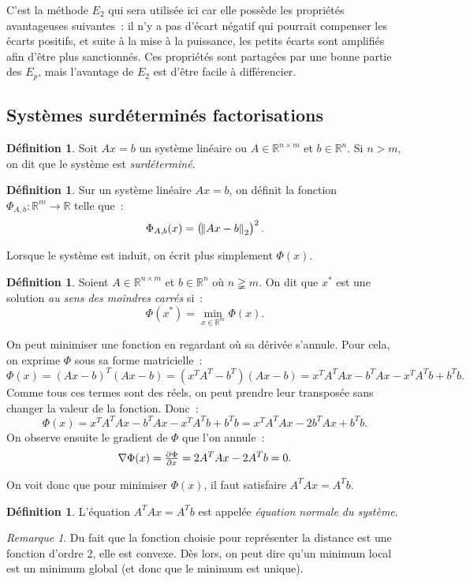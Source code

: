 \documentclass{article}
\theoremstyle{definition}
\newtheorem{déf}[thm]{Définition}
\theoremstyle{remark}
\newtheorem*{rmq}{Remarque}
\newcommand{\R}{\mathbb R}
\begin{document}
		C'est la méthode $E_2$ qui sera utilisée ici car elle possède les propriétés avantageuses suivantes~: il n'y a pas d'écart négatif qui pourrait compenser
		les écarts positifs, et suite à la mise à la puissance, les petits écarts sont amplifiés afin d'être plus sanctionnés. Ces propriétés sont partagées
		par une bonne partie des $E_p$, mais l'avantage de $E_2$ est d'être facile à différencier.

	\subsection{Systèmes surdéterminés factorisations}
		\begin{déf} Soit $Ax = b$ un système linéaire ou $A \in \R^{n \times m}$ et $b \in \R^n$. Si $n > m$, on dit que le système est \emph{surdéterminé}.
		\end{déf}

		\begin{déf} Sur un système linéaire $Ax = b$, on définit la fonction $\Phi_{A,b} : \R^m \to \R$ telle que~:
		\[\Phi_{A,b}(x) = \left(\norm {Ax-b}_2\right)^2.\]

		Lorsque le système est induit, on écrit plus simplement $\Phi(x)$.
		\end{déf}

		\begin{déf} Soient $A \in \R^{n \times m}$ et $b \in \R^n$ où $n \gneqq m$. On dit que $x^*$ est une solution \emph{au sens des moindres carrés} si~:
		\[\Phi(x^*) = \min_{x \in \R^m}\Phi(x).\]
		\end{déf}

		On peut minimiser une fonction en regardant où sa dérivée s'annule. Pour cela, on exprime $\Phi$ sous sa forme matricielle~:
		\[\Phi(x) = (Ax-b)^T(Ax-b) = (x^TA^T - b^T)(Ax - b) = x^TA^TAx - b^TAx - x^TA^Tb + b^Tb.\]
		Comme tous ces termes sont des réels, on peut prendre leur transposée sans changer la valeur de la fonction. Donc~:
		\[\Phi(x) = x^TA^TAx - b^TAx - x^TA^Tb + b^Tb = x^TA^TAx - 2b^TAx + b^Tb.\]
		On observe ensuite le gradient de $\Phi$ que l'on annule~:
		\[\nabla \Phi(x) = \pd \Phi x = 2A^TAx - 2A^Tb = 0.\]

		On voit donc que pour minimiser $\Phi(x)$, il faut satisfaire $A^TAx = A^Tb$.

		\begin{déf} L'équation $A^TAx = A^Tb$ est appelée \emph{équation normale du système}. \end{déf}

		\begin{rmq} Du fait que la fonction choisie pour représenter la distance est une fonction d'ordre 2, elle est convexe. Dès lors, on peut dire qu'un
		minimum local est un minimum global (et donc que le minimum est unique).
		\end{rmq}
\end{document}
